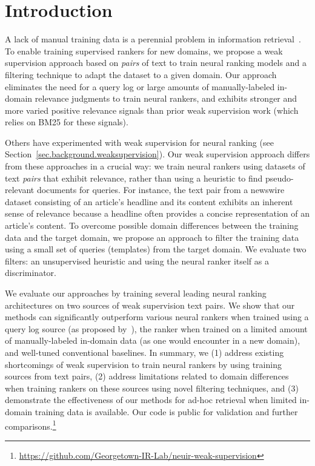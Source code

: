\section{Introduction} 
\label{sec.introduction}

A lack of manual training data is a perennial problem in information retrieval~\cite{Zamani2018SIGIR2W}.
To enable training supervised rankers for new domains, we propose a weak supervision approach based on \textit{pairs} of text to train neural ranking models and a filtering technique to adapt the dataset to a given domain. Our approach eliminates the need for a query log or large amounts of manually-labeled in-domain relevance judgments to train neural rankers, and exhibits stronger and more varied positive relevance signals than prior weak supervision work (which relies on BM25 for these signals).

Others have experimented with weak supervision for neural ranking (see Section~\ref{sec.background.weaksupervision}). Our weak supervision approach differs from these approaches in a crucial way: we train neural rankers using datasets of text \textit{pairs} that exhibit relevance, rather than using a heuristic to find pseudo-relevant documents for queries. For instance, the text pair from a newswire dataset consisting of an article's headline and its content exhibits an inherent sense of relevance because a headline often provides a concise representation of an article's content. To overcome possible domain differences between the training data and the target domain,
we propose an approach to filter the training data using a small set of queries (templates) from the target domain. We evaluate two filters: an unsupervised heuristic and using the neural ranker itself as a discriminator.

We evaluate our approaches by training several leading neural ranking architectures on two sources of weak supervision text pairs. We show that our methods can significantly outperform various neural rankers when trained using a query log source (as proposed by~\cite{dehghani2017neural}), the ranker when trained on a limited amount of manually-labeled in-domain data (as one would encounter in a new domain), and well-tuned conventional baselines. 
In summary, we (1) address existing shortcomings of weak supervision to train neural rankers by using training sources from text pairs, (2) address limitations related to domain differences when training rankers on these sources using novel filtering techniques, and (3) demonstrate the effectiveness of our methods for ad-hoc retrieval when limited in-domain training data is available. Our code is public for validation and further comparisons.\footnote{\url{https://github.com/Georgetown-IR-Lab/neuir-weak-supervision}}
